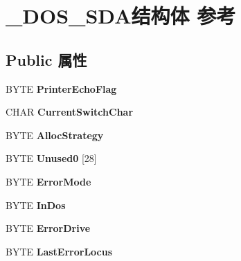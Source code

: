 \hypertarget{struct___d_o_s___s_d_a}{}\section{\+\_\+\+D\+O\+S\+\_\+\+S\+D\+A结构体 参考}
\label{struct___d_o_s___s_d_a}
\subsection*{Public 属性}
\begin{DoxyCompactItemize}
\item 
\mbox{\label{struct___d_o_s___s_d_a_a577d14f0932086c99e5c3e1d934d2665}} 
B\+Y\+TE {\bfseries Printer\+Echo\+Flag}
\item 
\mbox{\label{struct___d_o_s___s_d_a_a82457e6c36a447dffdbe1ff46263599e}} 
C\+H\+AR {\bfseries Current\+Switch\+Char}
\item 
\mbox{\label{struct___d_o_s___s_d_a_aa8c43ba17d69b3cfd38a5970d82d5865}} 
B\+Y\+TE {\bfseries Alloc\+Strategy}
\item 
\mbox{\label{struct___d_o_s___s_d_a_ac63b73d4045cfba625f64cab592d0f07}} 
B\+Y\+TE {\bfseries Unused0} \mbox{[}28\mbox{]}
\item 
\mbox{\label{struct___d_o_s___s_d_a_add94f4f0b7d855d4663f1a1bc10265fa}} 
B\+Y\+TE {\bfseries Error\+Mode}
\item 
\mbox{\label{struct___d_o_s___s_d_a_af3a4d5a15cf240f69a271408144d3519}} 
B\+Y\+TE {\bfseries In\+Dos}
\item 
\mbox{\label{struct___d_o_s___s_d_a_a25c0209e1c6ba9b7a96d845c671e90fb}} 
B\+Y\+TE {\bfseries Error\+Drive}
\item 
\mbox{\label{struct___d_o_s___s_d_a_ae8a38ae87fcdc4e54a220f914317f98c}} 
B\+Y\+TE {\bfseries Last\+Error\+Locus}
\item 
\mbox{\label{struct___d_o_s___s_d_a_a4459b9a801a871823fa4f263832b7596}} 

\end{DoxyCompactItemize}
